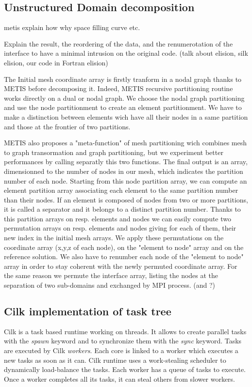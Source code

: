 \documentclass{IOS-Book-Article}
\begin{document}
\subsection{Unstructured Domain decomposition}

metis explain how why space filling curve etc.

Explain the result, the reordering of the data, and the renumerotation of the interface to have a minimal intrusion on the original code.
(talk about elision, silk elision, our code in Fortran elision)

The Initial mesh coordinate array is firstly tranform in a nodal graph thanks to METIS before decomposing it. Indeed, METIS recursive partitioning routine works directly
on a dual or nodal graph. We choose the nodal graph partitioning and use the node partitionment to create an element partitionment.
We have to make a distinction between elements wich have all their nodes in a same partition and those at the frontier of two partitions.

METIS also proposes a "meta-function" of mesh partitioning wich combines mesh to graph transormation and graph partitioning, but we experiment better performances by
calling separatly this two functions.
The final output is an array, dimensionned to the number of nodes in our mesh, which indicates the partition number of each node.
Starting from this node partition array, we can compute an element partition array associating each element to the same partition number than their nodes.
If an element is composed of nodes from two or more partitions, it is called a separator and it belongs to a distinct partition number.
Thanks to this partition arrays on resp. elements and nodes we can easily compute two permutation arrays on resp. elements and nodes giving for each of them, their new
index in the initial mesh arrays. We apply these permutations on the coordinate array (x,y,z of each node), on the "element to node" array and on the reference solution.
We also have to renumber each node of the "element to node" array in order to stay coherent with the newly permuted coordinate array. For the same reason we permute the
interface array, listing the nodes at the separation of two sub-domains and exchanged by MPI process. (and ?)

\subsection{Cilk implementation of task tree}

Cilk is a task based runtime working on threads. It allows to create parallel tasks with the \emph{spawn} keyword and to synchronize them with the \emph{sync} keyword.
Tasks are executed by Cilk \emph{workers}. Each core is linked to a worker which executes a new tasks as soon as it can.
Cilk runtime uses a work-stealing scheduler to dynamically load-balance the tasks. Each worker has a queue of tasks to execute.
Once a worker completes all its tasks, it can steal others from slower workers.
\end{document}
